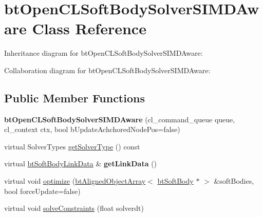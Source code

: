 \hypertarget{classbt_open_c_l_soft_body_solver_s_i_m_d_aware}{\section{bt\+Open\+C\+L\+Soft\+Body\+Solver\+S\+I\+M\+D\+Aware Class Reference}
\label{classbt_open_c_l_soft_body_solver_s_i_m_d_aware}
}


Inheritance diagram for bt\+Open\+C\+L\+Soft\+Body\+Solver\+S\+I\+M\+D\+Aware\+:


Collaboration diagram for bt\+Open\+C\+L\+Soft\+Body\+Solver\+S\+I\+M\+D\+Aware\+:
\subsection*{Public Member Functions}
\begin{DoxyCompactItemize}
\item 
\hypertarget{classbt_open_c_l_soft_body_solver_s_i_m_d_aware_a11f6c0929b49baf2f98578b39559938c}{{\bfseries bt\+Open\+C\+L\+Soft\+Body\+Solver\+S\+I\+M\+D\+Aware} (cl\+\_\+command\+\_\+queue queue, cl\+\_\+context ctx, bool b\+Update\+Achchored\+Node\+Pos=false)}\label{classbt_open_c_l_soft_body_solver_s_i_m_d_aware_a11f6c0929b49baf2f98578b39559938c}

\item 
virtual Solver\+Types \hyperlink{classbt_open_c_l_soft_body_solver_s_i_m_d_aware_a8f492cfc7f53190011532587428c5730}{get\+Solver\+Type} () const 
\item 
\hypertarget{classbt_open_c_l_soft_body_solver_s_i_m_d_aware_a9b57b562c8509de2dab95c70e1ba333a}{virtual \hyperlink{classbt_soft_body_link_data}{bt\+Soft\+Body\+Link\+Data} \& {\bfseries get\+Link\+Data} ()}\label{classbt_open_c_l_soft_body_solver_s_i_m_d_aware_a9b57b562c8509de2dab95c70e1ba333a}

\item 
virtual void \hyperlink{classbt_open_c_l_soft_body_solver_s_i_m_d_aware_ad1052da1c0e61eac7d9fe1df618c150c}{optimize} (\hyperlink{classbt_aligned_object_array}{bt\+Aligned\+Object\+Array}$<$ \hyperlink{classbt_soft_body}{bt\+Soft\+Body} $\ast$ $>$ \&soft\+Bodies, bool force\+Update=false)
\item 
virtual void \hyperlink{classbt_open_c_l_soft_body_solver_s_i_m_d_aware_a38d944c9dcaa0579e001f93da1b5244d}{solve\+Constraints} (float solverdt)
\end{DoxyCompactItemize}
